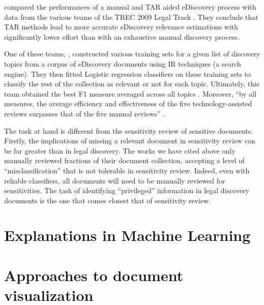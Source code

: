 \documentclass[\version]{l4proj}
\begin{document}
\textcite{grossmanTechnologyAssistedReviewEDiscovery2010} compared the performances of a manual and TAR aided eDiscovery process with data from the various teams of the TREC 2009 Legal Track \autocite{hedinOverviewTREC2009}.
They conclude that TAR methods lead to more accurate eDiscovery relevance estimations with significantly lower effort than with an exhaustive manual discovery process.

One of these teams, \textcite{cormackMachineLearningInformation2009}, constructed various training sets for a given list of discovery topics from a corpus of eDiscovery documents using IR techniques (a search engine).
They then fitted Logistic regression classifiers on these training sets to classify the rest of the collection as relevant or not for each topic.
Ultimately, this team obtained the best F1 measure averaged across all topics \autocite{hedinOverviewTREC2009}.
Moreover, ``by all measures, the average efficiency and effectiveness of the five technology-assisted reviews surpasses that of the five manual reviews'' \autocite[p.~43]{grossmanTechnologyAssistedReviewEDiscovery2010}.

The task at hand is different from the sensitivity review of sensitive documents.
Firstly, the implications of missing a relevant document in sensitivity review can be far greater than in legal discovery.
The works we have cited above only manually reviewed fractions of their document collection, accepting a level of ``misclassification'' that is not tolerable in sensitivity review.
Indeed, even with reliable classifiers, all documents will need to be manually reviewed for sensitivities.
The task of identifying ``privileged'' information in legal discovery documents is the one that comes closest that of sensitivity review.

\section{Explanations in Machine Learning}


\autocite{ribeiroWhyShouldTrust2016}

\autocite{lundbergUnifiedApproachInterpreting2017}

\section{Approaches to document visualization}
\end{document}
